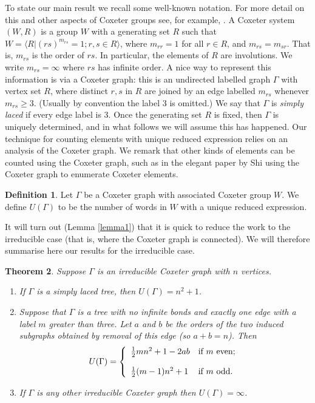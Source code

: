\documentclass[a4paper,12pt]{article}
\newtheorem{thm}{Theorem}[section]
\theoremstyle{definition}
\newtheorem{defn}[thm]{Definition}
\begin{document}
 To state our main result we recall some well-known notation. For more detail on this and other aspects of Coxeter groups see, for example, \cite{humphreys}. A Coxeter system $(W,R)$ is a group $W$ with a generating set $R$ such that $W = \langle R | (rs)^{m_{rs}} = 1; r, s \in R\rangle$, where $m_{rr} = 1$ for all $r \in R$, and $m_{rs} = m_{sr}$. That is, $m_{rs}$ is the order of $rs$. In particular, the elements of $R$ are involutions. We write $m_{rs} = \infty$ where $rs$ has infinite order. A nice way to represent this information is via a Coxeter graph: this is an undirected labelled graph $\Gamma$ with vertex set $R$, where distinct $r, s$ in $R$ are joined by an edge labelled $m_{rs}$ whenever $m_{rs} \geq 3$.  (Usually by convention the label 3 is omitted.) We say that $\Gamma$ is {\em simply laced} if every edge label is 3. Once the generating set $R$ is fixed, then $\Gamma$ is uniquely determined, and in what follows we will assume this has happened. Our technique for counting elements with unique reduced expression relies on an analysis of the Coxeter graph. We remark that other kinds of elements can be counted using the Coxeter graph, such as in the elegant paper by Shi \cite{shi} using the Coxeter graph to enumerate Coxeter elements.
 
 \begin{defn}
 Let $\Gamma$ be a Coxeter graph with associated Coxeter group $W$. We define $U(\Gamma)$ to be the number of words in $W$ with a unique reduced expression. 
 \end{defn}
 
 It will turn out (Lemma \ref{lemma1}) that it is quick to reduce the work to the irreducible case (that is, where the Coxeter graph is connected). We will therefore summarise here our results for the irreducible case. 
 
 \begin{thm}\label{main}
 Suppose $\Gamma$ is an irreducible Coxeter graph with $n$ vertices. \begin{enumerate}
 \item If $\Gamma$ is a simply laced tree, then $U(\Gamma) = n^2 + 1$.
 \item Suppose that $\Gamma$ is a tree with no infinite bonds and exactly one edge with a label $m$ greater than three. Let $a$ and $b$ be the orders of the two induced subgraphs obtained by removal of this edge (so $a + b = n$). Then $$U(\Gamma) = \left\{\begin{array}{ll} \textstyle\frac{1}{2}mn^2 + 1 - 2ab   & {\text{if $m$ even;}}\vspace*{4mm}\\
   \textstyle\frac{1}{2}(m-1)n^2 + 1  & {\text{if $m$ odd.}}
   \end{array}\right.$$
   \item If $\Gamma$ is any other irreducible Coxeter graph then $U(\Gamma) = \infty$.
 \end{enumerate} 
 \end{thm}
\end{document}
